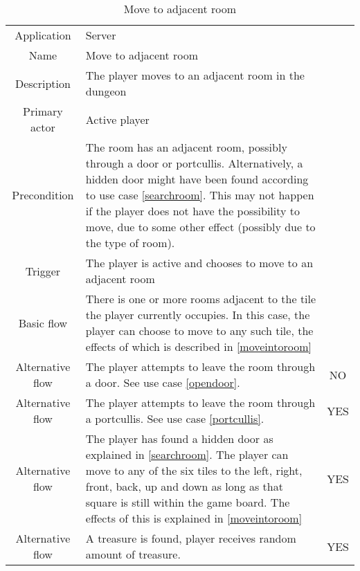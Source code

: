 \documentclass[a4paper,10pt]{report}
\begin{document}
\begin{table}
\caption{Move to adjacent room}
\label{moveoutfromroom}
\begin{tabular}{|c| p{9cm}|c}
\hline
Application & Server & \\
Name & Move to adjacent room & \\
Description & The player moves to an adjacent room in the dungeon & \\
Primary actor & Active player & \\
Precondition & The room has an adjacent room, possibly through a door or portcullis. Alternatively, a hidden door might have been found according to use case \ref{searchroom}. This may not happen if the player does not have the possibility to move, due to some other effect (possibly due to the type of room). & \\
Trigger & The player is active and chooses to move to an adjacent room  & \\ \hline
Basic flow & There is one or more rooms adjacent to the tile the player currently occupies. In this case, the player can choose to move to any such tile, the effects of which is described in \ref{moveintoroom} & \\ \hline
Alternative flow & The player attempts to leave the room through a door. See use case \ref{opendoor}. & NO \\\hline
Alternative flow & The player attempts to leave the room through a portcullis. See use case \ref{portcullis}. & YES \\ \hline
Alternative flow & The player has found a hidden door as explained in \ref{searchroom}. The player can move to any of the six tiles to the left, right, front, back, up and down as long as that square is still within the game board. The effects of this is explained in \ref{moveintoroom} & YES \\ \hline
Alternative flow & A treasure is found, player receives random amount of treasure. & YES \\
\hline
\end{tabular}
\end{table}
\end{document}
